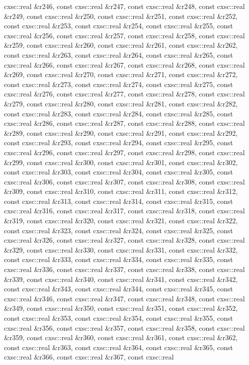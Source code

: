 \begin{DoxyCompactItemize}
cxsc\-::real \&r246, const cxsc\-::real \&r247, const cxsc\-::real \&r248, const cxsc\-::real \&r249, const cxsc\-::real \&r250, const cxsc\-::real \&r251, const cxsc\-::real \&r252, const cxsc\-::real \&r253, const cxsc\-::real \&r254, const cxsc\-::real \&r255, const cxsc\-::real \&r256, const cxsc\-::real \&r257, const cxsc\-::real \&r258, const cxsc\-::real \&r259, const cxsc\-::real \&r260, const cxsc\-::real \&r261, const cxsc\-::real \&r262, const cxsc\-::real \&r263, const cxsc\-::real \&r264, const cxsc\-::real \&r265, const cxsc\-::real \&r266, const cxsc\-::real \&r267, const cxsc\-::real \&r268, const cxsc\-::real \&r269, const cxsc\-::real \&r270, const cxsc\-::real \&r271, const cxsc\-::real \&r272, const cxsc\-::real \&r273, const cxsc\-::real \&r274, const cxsc\-::real \&r275, const cxsc\-::real \&r276, const cxsc\-::real \&r277, const cxsc\-::real \&r278, const cxsc\-::real \&r279, const cxsc\-::real \&r280, const cxsc\-::real \&r281, const cxsc\-::real \&r282, const cxsc\-::real \&r283, const cxsc\-::real \&r284, const cxsc\-::real \&r285, const cxsc\-::real \&r286, const cxsc\-::real \&r287, const cxsc\-::real \&r288, const cxsc\-::real \&r289, const cxsc\-::real \&r290, const cxsc\-::real \&r291, const cxsc\-::real \&r292, const cxsc\-::real \&r293, const cxsc\-::real \&r294, const cxsc\-::real \&r295, const cxsc\-::real \&r296, const cxsc\-::real \&r297, const cxsc\-::real \&r298, const cxsc\-::real \&r299, const cxsc\-::real \&r300, const cxsc\-::real \&r301, const cxsc\-::real \&r302, const cxsc\-::real \&r303, const cxsc\-::real \&r304, const cxsc\-::real \&r305, const cxsc\-::real \&r306, const cxsc\-::real \&r307, const cxsc\-::real \&r308, const cxsc\-::real \&r309, const cxsc\-::real \&r310, const cxsc\-::real \&r311, const cxsc\-::real \&r312, const cxsc\-::real \&r313, const cxsc\-::real \&r314, const cxsc\-::real \&r315, const cxsc\-::real \&r316, const cxsc\-::real \&r317, const cxsc\-::real \&r318, const cxsc\-::real \&r319, const cxsc\-::real \&r320, const cxsc\-::real \&r321, const cxsc\-::real \&r322, const cxsc\-::real \&r323, const cxsc\-::real \&r324, const cxsc\-::real \&r325, const cxsc\-::real \&r326, const cxsc\-::real \&r327, const cxsc\-::real \&r328, const cxsc\-::real \&r329, const cxsc\-::real \&r330, const cxsc\-::real \&r331, const cxsc\-::real \&r332, const cxsc\-::real \&r333, const cxsc\-::real \&r334, const cxsc\-::real \&r335, const cxsc\-::real \&r336, const cxsc\-::real \&r337, const cxsc\-::real \&r338, const cxsc\-::real \&r339, const cxsc\-::real \&r340, const cxsc\-::real \&r341, const cxsc\-::real \&r342, const cxsc\-::real \&r343, const cxsc\-::real \&r344, const cxsc\-::real \&r345, const cxsc\-::real \&r346, const cxsc\-::real \&r347, const cxsc\-::real \&r348, const cxsc\-::real \&r349, const cxsc\-::real \&r350, const cxsc\-::real \&r351, const cxsc\-::real \&r352, const cxsc\-::real \&r353, const cxsc\-::real \&r354, const cxsc\-::real \&r355, const cxsc\-::real \&r356, const cxsc\-::real \&r357, const cxsc\-::real \&r358, const cxsc\-::real \&r359, const cxsc\-::real \&r360, const cxsc\-::real \&r361, const cxsc\-::real \&r362, const cxsc\-::real \&r363, const cxsc\-::real \&r364, const cxsc\-::real \&r365, const cxsc\-::real \&r366, const cxsc\-::real \&r367, const cxsc\-::real 
\end{DoxyCompactItemize}
